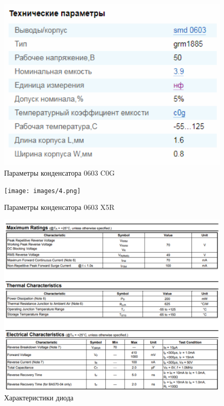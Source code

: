 \begin{figure}
	\centering
	\caption{Параметры конденсатора 0603 C0G}
	\includegraphics{images/3.png}
\end{figure}

\begin{figure}
	\centering
	\caption{Параметры конденсатора 0603 X5R}
	\texttt{[image: images/4.png]}
\end{figure}

\begin{figure}
	\centering
	\caption{Характеристики диода}
	\includegraphics{images/5.png}
\end{figure}

